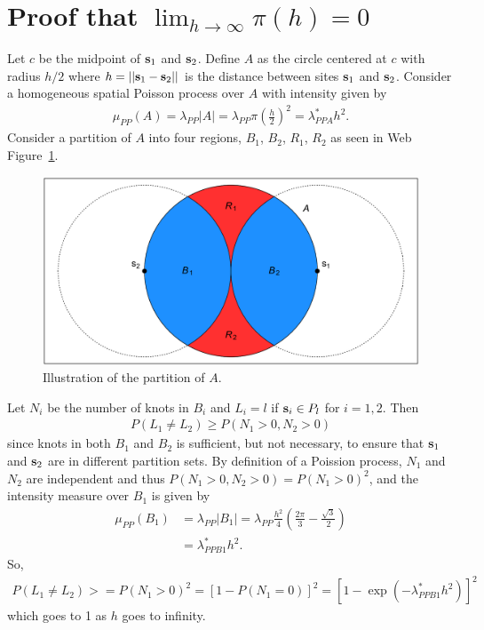 \documentclass[useAMS,usenatbib,referee]{biomweb}
\renewcommand{\fref}[1]{Web Figure~\ref{#1}}
\begin{document}
\section{Proof that $\lim_{h \rightarrow \infty} \pi(h) = 0$} \label{sta:proofsamepartition}
Let $c$ be the midpoint of $\mbox{\bf s}_1$ and $\mbox{\bf s}_2$.
Define $A$ as the circle centered at $c$ with radius $h / 2$ where $h = ||\mbox{\bf s}_1 - \mbox{\bf s}_2||$ is the distance between sites $\mbox{\bf s}_1$ and $\mbox{\bf s}_2$.
Consider a homogeneous spatial Poisson process over $A$ with intensity given by
\begin{align*}
  \mu_{PP}(A) = \lambda_{PP} |A| = \lambda_{PP} \pi \left(\frac{h}{2}\right)^2 = \lambda_{PPA}^* h^2.
\end{align*}
Consider a partition of $A$ into four regions, $B_1$, $B_2$, $R_1$, $R_2$ as seen in \fref{stfig:hpp}.
\begin{figure}
  \includegraphics[width=\linewidth]{plots/circles}
  \caption{Illustration of the partition of $A$.}
  \label{stfig:hpp}
\end{figure}
Let $N_i$ be the number of knots in $B_i$ and $L_i = l$ if $\mbox{\bf s}_i \in P_l$ for $i = 1, 2$.
Then
\begin{align}
  P(L_1 \neq L_2) \ge P(N_1 > 0, N_2 > 0)
\end{align}
since knots in both $B_1$ and $B_2$ is sufficient, but not necessary, to ensure that $\mbox{\bf s}_1$ and $\mbox{\bf s}_2$ are in different partition sets.
By definition of a Poission process, $N_1$ and $N_2$ are independent and thus $P(N_1 > 0, N_2 > 0) = P(N_1 > 0)^2$, and the intensity measure over $B_1$ is given by
\begin{align}
  \mu_{PP}(B_1) &= \lambda_{PP} |B_1| = \lambda_{PP} \frac{h^2}{4} \left(\frac{2 \pi}{3} - \frac{\sqrt{3}}{2} \right) \nonumber \\
       &= \lambda^*_{PPB1} h^2.
\end{align}
So,
\begin{align}
  P(L_1 \neq L_2) >= P(N_1 > 0)^2 = [1 - P(N_1 = 0)]^2 = [1 - \exp\left(-\lambda^*_{PPB1} h^2\right)]^2
\end{align}
which goes to 1 as $h$ goes to infinity.
\end{document}
